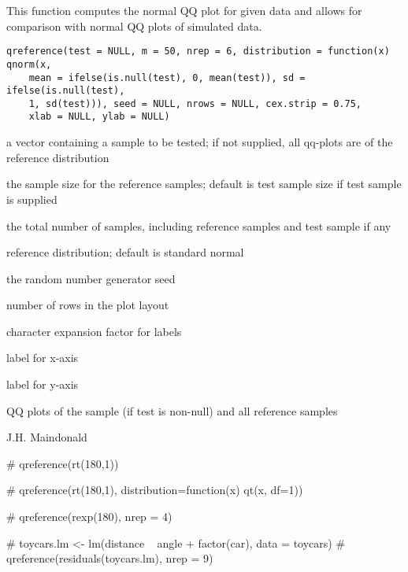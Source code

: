 \begin{Description}\relax
This function computes the normal QQ plot for given data and
allows for comparison with normal QQ plots of simulated data.
\end{Description}
\begin{Usage}
\begin{verbatim}
qreference(test = NULL, m = 50, nrep = 6, distribution = function(x) qnorm(x, 
    mean = ifelse(is.null(test), 0, mean(test)), sd = ifelse(is.null(test), 
    1, sd(test))), seed = NULL, nrows = NULL, cex.strip = 0.75, 
    xlab = NULL, ylab = NULL) 
\end{verbatim}
\end{Usage}
\begin{Arguments}
\begin{ldescription}
\item[\code{test}] a vector containing a sample to be tested; if not supplied,
all qq-plots are of the reference distribution
\item[\code{m}] the sample size for the reference samples; default is
test sample size if test sample is supplied
\item[\code{nrep}] the total number of samples, including reference
samples and test sample if any
\item[\code{distribution}] reference distribution; default is standard normal
\item[\code{seed}] the random number generator seed
\item[\code{nrows}] number of rows in the plot layout
\item[\code{cex.strip}] character expansion factor for labels
\item[\code{xlab}] label for x-axis
\item[\code{ylab}] label for y-axis
\end{ldescription}
\end{Arguments}
\begin{Value}
QQ plots of the sample (if test is non-null) and all reference samples
\end{Value}
\begin{Author}\relax
J.H. Maindonald
\end{Author}
\begin{Examples}
\begin{ExampleCode}
# qreference(rt(180,1))

# qreference(rt(180,1), distribution=function(x) qt(x, df=1))

# qreference(rexp(180), nrep = 4)

# toycars.lm <- lm(distance ~ angle + factor(car), data = toycars)
# qreference(residuals(toycars.lm), nrep = 9)
\end{ExampleCode}
\end{Examples}

